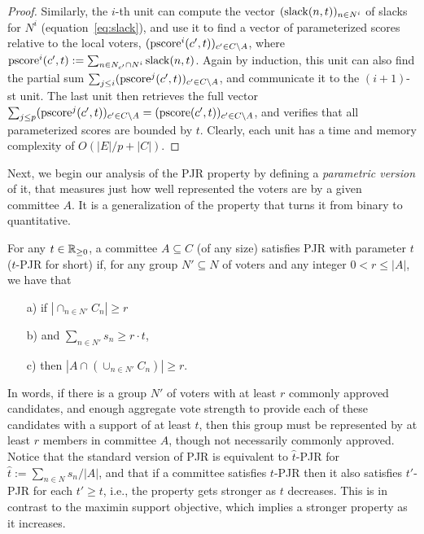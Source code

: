 \begin{proof}
Similarly, the $i$-th unit can compute the vector $(\operatorname{slack}(n,t))_{n\in N^i}$ of slacks for $N^i$ (equation~\ref{eq:slack}), and use it to find a vector of parameterized scores relative to the local voters, $(\operatorname{pscore}^i(c',t))_{c'\in C\setminus A}$, where $\operatorname{pscore}^i(c', t):=\sum_{n\in N_{c'}\cap N^i} \operatorname{slack}(n,t)$. 
Again by induction, this unit can also find the partial sum $\sum_{j\leq i} (\operatorname{pscore}^j(c',t))_{c'\in C\setminus A}$, and communicate it to the $(i+1)$-st unit. 
The last unit then retrieves the full vector $\sum_{j\leq p} (\operatorname{pscore}^j(c',t))_{c'\in C\setminus A}=(\operatorname{pscore}(c',t))_{c'\in C\setminus A}$, and verifies that all parameterized scores are bounded by $t$. 
Clearly, each unit has a time and memory complexity of $O(|E|/p + |C|)$.
\end{proof}

Next, we begin our analysis of the PJR property by defining a \emph{parametric version} of it, that measures just how well represented the voters are by a given committee $A$. It is a generalization of the property that turns it from binary to quantitative.

\begin{definition}
For any $t\in\mathbb{R}_{\geq 0}$, a committee $A\subseteq C$ (of any size) satisfies PJR with parameter $t$ ($t$-PJR for short) if, for any group $N'\subseteq N$ of voters and any integer $0<r\leq |A|$, we have that
\begin{itemize}
\item[a)] if $|\cap_{n\in N'} C_n|\geq r$
\item[b)] and $\sum_{n\in N'} s_n \geq r\cdot t$, 
\item[c)] then $|A\cap (\cup_{n\in N'} C_n)|\geq r$.
\end{itemize}
\end{definition}

In words, if there is a group $N'$ of voters with at least $r$ commonly approved candidates, and enough aggregate vote strength to provide each of these candidates with a support of at least $t$, then this group must be represented by at least $r$ members in committee $A$, though not necessarily commonly approved. 
Notice that the standard version of PJR is equivalent to $\hat{t}$-PJR for $\hat{t}:=\sum_{n\in N} s_n / |A|$, and that if a committee satisfies $t$-PJR then it also satisfies $t'$-PJR for each $t'\geq t$, i.e., the property gets stronger as $t$ decreases. 
This is in contrast to the maximin support objective, which implies a stronger property as it increases.

